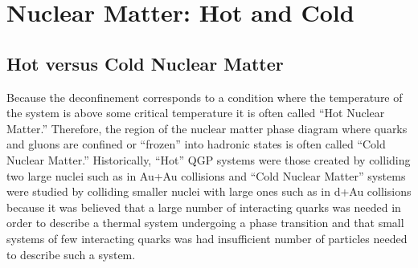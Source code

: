 

\chapter{Nuclear Matter: Hot and Cold} %
\section{Hot versus Cold Nuclear Matter}
Because the deconfinement corresponds to a condition where the temperature of the system is above some critical temperature it is often called ``Hot Nuclear Matter.'' Therefore, the region of the nuclear matter phase diagram where quarks and gluons are confined or ``frozen'' into hadronic states is often called ``Cold Nuclear Matter.'' Historically, ``Hot'' QGP systems were those created by colliding two large nuclei such as in Au+Au collisions and ``Cold Nuclear Matter'' systems were studied by colliding smaller nuclei with large ones such as in d+Au collisions because it was believed that a large number of interacting quarks was needed in order to describe a thermal system undergoing a phase transition and that small systems of few interacting quarks was had insufficient number of particles needed to describe such a system.

